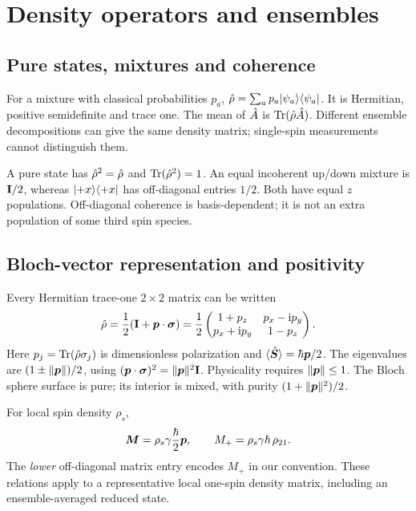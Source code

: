 \section{Density operators and ensembles}
\label{sec:02:density-operators-and-ensembles}
\subsection{Pure states, mixtures and coherence}
For a mixture with classical probabilities $p_a$,
$\hat{\rho}=\sum_a p_a\lvert \psi_a\rangle\langle \psi_a\rvert$.
It is Hermitian, positive semidefinite and trace one.
The mean of $\hat{A}$ is $\operatorname{Tr}(\hat{\rho}\hat{A})$.
Different ensemble decompositions can give the same density matrix;
single-spin measurements cannot distinguish them.

A pure state has $\hat{\rho}^2=\hat{\rho}$ and $\operatorname{Tr}(\hat{\rho}^2)=1$.
An equal incoherent up/down mixture is $\mathbf{I}/2$, whereas
$\lvert +x\rangle\langle +x\rvert$ has off-diagonal entries $1/2$.
Both have equal $z$ populations. Off-diagonal coherence is basis-dependent;
it is not an extra population of some third spin species.

\subsection{Bloch-vector representation and positivity}
Every Hermitian trace-one $2\times2$ matrix can be written
\begin{equation}
 \hat{\rho}=\frac12(\mathbf{I}+\bm{p}\cdot\bm{\sigma})
 =\frac12\begin{pmatrix}1+p_z&p_x-\mathrm{i} p_y\\p_x+\mathrm{i} p_y&1-p_z\end{pmatrix}.
 \label{eq:02:density-bloch}
\end{equation}
Here $p_j=\operatorname{Tr}(\hat{\rho}\sigma_j)$ is dimensionless polarization and
$\langle\hat{\bm{S}}\rangle=\hbar\bm{p}/2$.
The eigenvalues are $(1\pm\lVert\bm{p}\rVert)/2$, using
$(\bm{p}\cdot\bm{\sigma})^2=\lVert\bm{p}\rVert^2\mathbf{I}$.
Physicality requires $\lVert\bm{p}\rVert\leq1$.
The Bloch sphere surface is pure; its interior is mixed, with purity
$(1+\lVert\bm{p}\rVert^2)/2$.

For local spin density $\rho_s$,
\begin{equation}
 \bm{M}=\rho_s\gamma\frac{\hbar}{2}\bm{p},\qquad
 M_+=\rho_s\gamma\hbar\,\rho_{21}.
 \label{eq:02:magnetization}
\end{equation}
The \emph{lower} off-diagonal matrix entry encodes $M_+$ in our convention.
These relations apply to a representative local one-spin density matrix,
including an ensemble-averaged reduced state.

